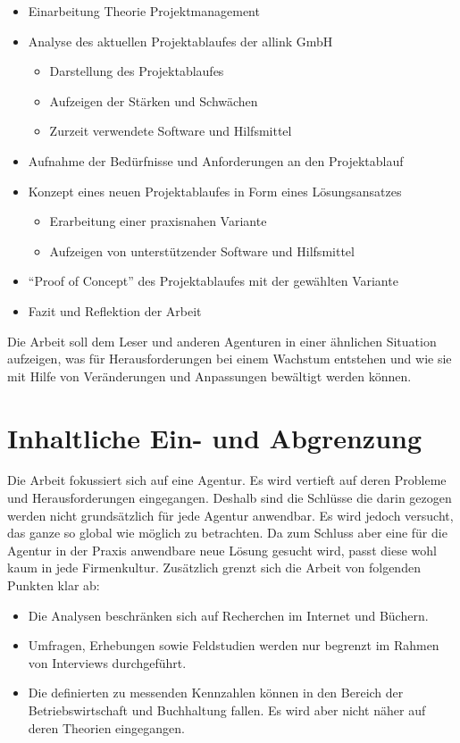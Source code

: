 \begin{itemize}
    \item Einarbeitung Theorie Projektmanagement
    \item Analyse des aktuellen Projektablaufes der allink GmbH
    \begin{itemize}
        \item Darstellung des Projektablaufes
        \item Aufzeigen der Stärken und Schwächen
        \item Zurzeit verwendete Software und Hilfsmittel
    \end{itemize}
    \item Aufnahme der Bedürfnisse und Anforderungen an den Projektablauf
    \item Konzept eines neuen Projektablaufes in Form eines Lösungsansatzes
    \begin{itemize}
        \item Erarbeitung einer praxisnahen Variante
        \item Aufzeigen von unterstützender Software und Hilfsmittel
    \end{itemize}
    \item ``Proof of Concept'' des Projektablaufes mit der gewählten Variante
    \item Fazit und Reflektion der Arbeit
\end{itemize}

Die Arbeit soll dem Leser und anderen Agenturen in einer ähnlichen Situation
aufzeigen, was für Herausforderungen bei einem Wachstum entstehen und wie
sie mit Hilfe von Veränderungen und Anpassungen bewältigt werden können.

\section{Inhaltliche Ein- und Abgrenzung}
Die Arbeit fokussiert sich auf eine Agentur. Es wird vertieft auf deren Probleme
und Herausforderungen eingegangen. Deshalb sind die Schlüsse die darin gezogen
werden nicht grundsätzlich für jede Agentur anwendbar. Es wird jedoch versucht, das
ganze so global wie möglich zu betrachten. Da zum Schluss aber eine für die
Agentur in der Praxis anwendbare neue Lösung gesucht wird, passt diese wohl
kaum in jede Firmenkultur. 
Zusätzlich grenzt sich die Arbeit von folgenden Punkten klar ab:

\begin{itemize}
    \item Die Analysen beschränken sich auf Recherchen im Internet und Büchern.
    \item Umfragen, Erhebungen sowie Feldstudien werden nur begrenzt im Rahmen
        von Interviews durchgeführt.
    \item Die definierten zu messenden Kennzahlen können in den Bereich der Betriebswirtschaft
        und Buchhaltung fallen. Es wird aber nicht näher auf deren Theorien eingegangen.
\end{itemize}

